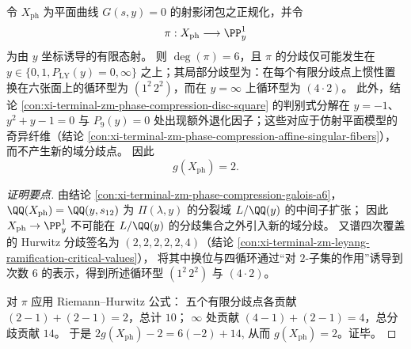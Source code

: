 \begin{conclusion}\label{con:xi-terminal-zm-phase-compression-curve-genus2}
令 \(X_{\mathrm{ph}}\) 为平面曲线 \(G(s,y)=0\) 的射影闭包之正规化，并令
\[
\pi:X_{\mathrm{ph}}\longrightarrow \PP^1_y
\]
为由 \(y\) 坐标诱导的有限态射。
则 \(\deg(\pi)=6\)，且 \(\pi\) 的分歧仅可能发生在
\(
y\in\{0,1,P_{\mathrm{LY}}(y)=0,\infty\}
\)
之上；其局部分歧型为：在每个有限分歧点上惯性置换在六张面上的循环型为 \((1^2\,2^2)\)，而在 \(y=\infty\) 上循环型为 \((4\cdot 2)\)。
此外，结论 \ref{con:xi-terminal-zm-phase-compression-disc-square} 的判别式分解在 \(y=-1\)、\(y^{2}+y-1=0\) 与 \(P_9(y)=0\) 处出现额外退化因子；这些对应于仿射平面模型的奇异纤维（结论 \ref{con:xi-terminal-zm-phase-compression-affine-singular-fibers}），而不产生新的域分歧点。
因此
\[
g(X_{\mathrm{ph}})=2.
\]
\end{conclusion}
\begin{proof}[证明要点]
由结论 \ref{con:xi-terminal-zm-phase-compression-galois-a6}，\(\QQ(X_{\mathrm{ph}})=\QQ(y,s_{12})\) 为 \(\Pi(\lambda,y)\) 的分裂域 \(L/\QQ(y)\) 的中间子扩张；
因此 \(X_{\mathrm{ph}}\to\PP^1_y\) 不可能在 \(L/\QQ(y)\) 的分歧集合之外引入新的域分歧。
又谱四次覆盖的 Hurwitz 分歧签名为 \((2,2,2,2,2,4)\)（结论 \ref{con:xi-terminal-zm-leyang-ramification-critical-values}），
将其中换位与四循环通过“对 \(2\)-子集的作用”诱导到次数 \(6\) 的表示，得到所述循环型 \((1^2\,2^2)\) 与 \((4\cdot 2)\)。
\par
对 \(\pi\) 应用 Riemann--Hurwitz 公式：
五个有限分歧点各贡献 \((2-1)+(2-1)=2\)，总计 \(10\)；
\(\infty\) 处贡献 \((4-1)+(2-1)=4\)，总分歧贡献 \(14\)。
于是
\(
2g(X_{\mathrm{ph}})-2=6(-2)+14
\),
从而 \(g(X_{\mathrm{ph}})=2\)。证毕。
\end{proof}

